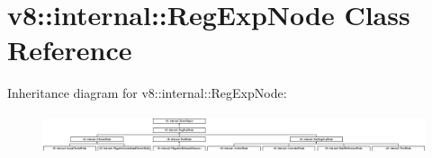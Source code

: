 \hypertarget{classv8_1_1internal_1_1_reg_exp_node}{}\section{v8\+:\+:internal\+:\+:Reg\+Exp\+Node Class Reference}
\label{classv8_1_1internal_1_1_reg_exp_node}
Inheritance diagram for v8\+:\+:internal\+:\+:Reg\+Exp\+Node\+:\begin{figure}[H]
\begin{center}
\leavevmode
\includegraphics[height=1.185185cm]{classv8_1_1internal_1_1_reg_exp_node}
\end{center}
\end{figure}

